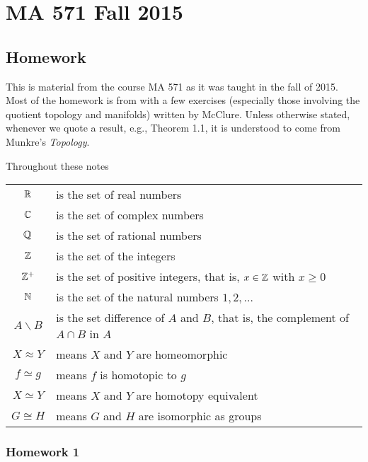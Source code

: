 \chapter{MA 571 Fall 2015}
\thispagestyle{empty}
\bigskip
\section{Homework}
This is material from the course MA 571 as it was taught in the fall of
2015. Most of the homework is from \cite{munkres} with a few exercises
(especially those involving the quotient topology and manifolds) written by
McClure. Unless otherwise stated, whenever we quote a result, e.g., Theorem
1.1, it is understood to come from Munkre's \emph{Topology}.

Throughout these notes

\begin{tabular}{cl}
  $\mathbb{R}$ & is the set of real numbers\\
  $\mathbb{C}$ & is the set of complex numbers\\
  $\mathbb{Q}$ & is the set of rational numbers\\
  $\mathbb{Z}$ & is the set of the integers\\
  $\mathbb{Z}^+$ & is the set of positive integers, that is, $x\in\mathbb{Z}$ with
             $x\geq 0$\\
  $\mathbb{N}$ & is the set of the natural numbers $1,2,\ldots$\\
  $A\smallsetminus B$ & is the set difference of $A$ and $B$, that is, the
                        complement of $A\cap B$ in $A$\\
  $X\approx Y$& means $X$ and $Y$ are homeomorphic\\
  $f\simeq g$& means $f$ is homotopic to $g$\\
  $X\simeq Y$&means $X$ and $Y$ are homotopy equivalent\\
  $G\cong H$& means $G$ and $H$ are isomorphic as groups
\end{tabular}

\newpage
\subsection{Homework 1}


